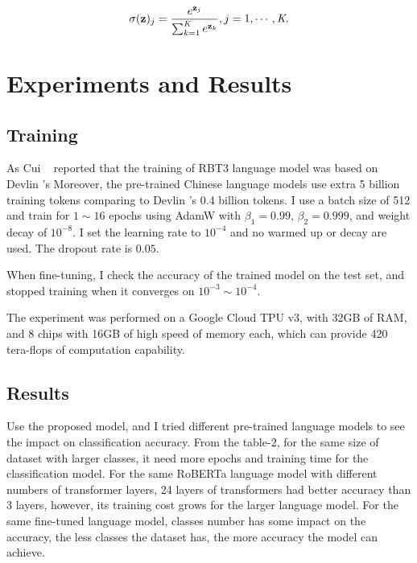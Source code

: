 \documentclass[review]{cvpr}
\begin{document}
\begin{equation}
  \sigma(\textbf{z})_j = {e^{\textbf{z}_j} \over {\sum_{k=1}^{\textit{K}} e^{\textbf{z}_k}}}, j=1,\cdots,\textit{K}.
\end{equation}


\section{Experiments and Results}


\subsection{Training}

As Cui \etal~\cite{cui2020revisiting} reported that the training of RBT3 language model was based on Devlin \etal's
Moreover, the pre-trained Chinese language models use extra 5 billion training tokens comparing to Devlin \etal's 0.4 billion tokens.
I use a batch size of 512 and train for $1\sim16$ epochs using AdamW with $\beta_1=0.99$, $\beta_2=0.999$, and weight decay of $10^{-8}$.
I set the learning rate to $10^{-4}$ and no warmed up or decay are used.
The dropout rate is $0.05$.

\par When fine-tuning, I check the accuracy of the trained model on the test set, and stopped training when it converges on $10^{-3}\sim10^{-4}$.

\par The experiment was performed on a Google Cloud TPU v3, with 32GB of RAM, and 8 chips with 16GB of high speed of memory each,
which can provide 420 tera-flops of computation capability.


\subsection{Results}

Use the proposed model, and I tried different pre-trained language models to see the impact on classification accuracy.
From the table-2, for the same size of dataset with larger classes, it need more epochs and training time for the classification model.
For the same RoBERTa language model with different numbers of transformer layers, 24 layers of transformers had better accuracy than 3 layers,
however, its training cost grows for the larger language model.
For the same fine-tuned language model, classes number has some impact on the accuracy,
the less classes the dataset has, the more accuracy the model can achieve.
\end{document}
